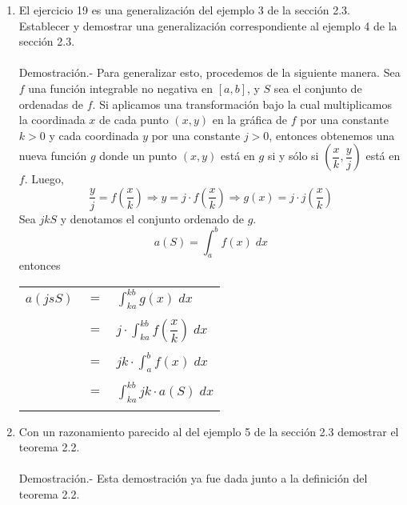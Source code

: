 \begin{enumerate}[\bfseries 1.]
\begin{enumerate}[\bfseries a)]
\end{enumerate}

\item El ejercicio 19 es una generalización del ejemplo 3 de la sección 2.3. Establecer y demostrar una generalización correspondiente al ejemplo 4 de la sección 2.3.\\\\
    Demostración.-\; Para generalizar esto, procedemos de la siguiente manera. Sea $f$ una función integrable no negativa en $[a, b]$, y $S$ sea el conjunto de ordenadas de $f$. Si aplicamos una transformación bajo la cual multiplicamos la coordinada $x$ de cada punto $(x, y)$ en la gráfica de $f$ por una constante $k> 0$ y cada coordinada $y$ por una constante $j>0$, entonces obtenemos una nueva función $g$ donde un punto $(x, y)$ está en $g$ si  y sólo si $ \left(\dfrac{x}{k}, \dfrac{y}{j}\right)$ está en $f$. Luego,
    $$\dfrac{y}{j} = f\left(\dfrac{x}{k}\right) \Longrightarrow y = j\cdot f\left(\dfrac{x}{k}\right) \Longrightarrow g(x)=j\cdot j\left(\dfrac{x}{k}\right)$$
    Sea $jkS$ y denotamos el conjunto ordenado de $g$.
    $$ a(S) = \int_a^b f(x)\; dx$$
    entonces 
    \begin{center}
	\begin{tabular}{rcl}
	    $a(jsS)$&$=$&$\displaystyle\int_{ka}^{kb} g(x) \; dx$\\\\
	    &$=$&$j\cdot \displaystyle\int_{ka}^{kb} f\left(\dfrac{x}{k}\right) \; dx$\\\\
	    &$=$&$jk\cdot \displaystyle\int_{a}^{b} f(x) \; dx$\\\\
	    &$=$&$\displaystyle\int_{ka}^{kb} jk\cdot a(S) \; dx$\\\\

	\end{tabular}
    \end{center}

\item Con un razonamiento parecido al del ejemplo 5 de la sección 2.3 demostrar el teorema 2.2.\\\\
    Demostración.-\; Esta demostración ya fue dada junto a la definición del teorema 2.2.\\\\

\end{enumerate}


